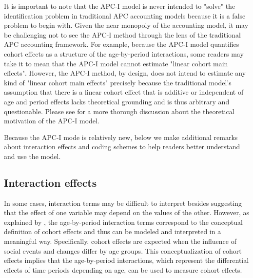 It is important to note that the APC-I model is never intended to "solve" the identification problem in traditional APC accounting models because it is a false problem to begin with. Given the near monopoly of the accounting model, it may be challenging not to see the APC-I method through the lens of the traditional APC accounting framework. For example, because the APC-I model quantifies cohort effects as a structure of the age-by-period interactions, some readers may take it to mean that the APC-I model cannot estimate "linear cohort main effects". However, the APC-I method, by design, does not intend to estimate any kind of "linear cohort main effects" precisely because the traditional model's assumption that there is a linear cohort effect that is additive or independent of age and period effects lacks theoretical grounding and is thus arbitrary and questionable. Please see \citet{luo_age-period-cohort-interaction_2020} for a more thorough discussion about the theoretical motivation of the APC-I model. 

Because the APC-I mode is relatively new, below we make additional remarks about interaction effects and coding schemes to help readers better understand and use the model.  

\subsection{Interaction effects} \label{interaction}

In some cases, interaction terms may be difficult to interpret besides suggesting that the effect of one variable may depend on the values of the other.  However, as explained by \citet{luo_age-period-cohort-interaction_2020}, the age-by-period interaction terms correspond to the conceptual definition of cohort effects and thus can be modeled and interpreted in a meaningful way.  Specifically, cohort effects are expected when the influence of social events and changes differ by age groups.  This conceptualization of cohort effects implies that the age-by-period interactions, which represent the differential effects of time periods depending on age, can be used to measure cohort effects. 

